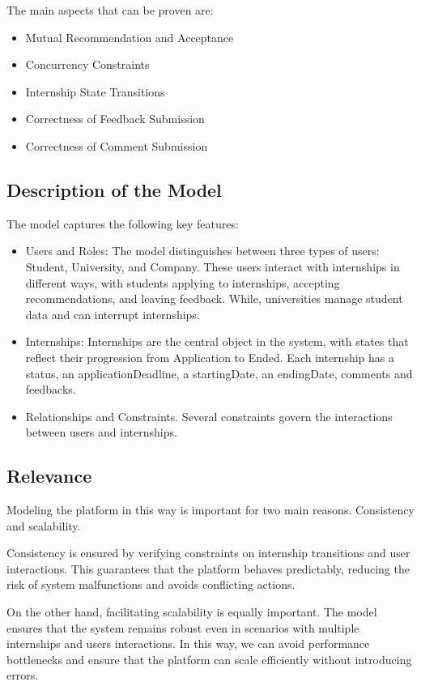 \documentclass{article}
\begin{document}
The main aspects that can be proven are:
\begin{itemize}
    \item Mutual Recommendation and Acceptance
    \item Concurrency Constraints
    \item Internship State Transitions
    \item Correctness of Feedback Submission
    \item Correctness of Comment Submission
\end{itemize}
\subsection{Description of the Model}
The model captures the following key features:
\begin{itemize}
    \item Users and Roles:
    The model distinguishes between three types of users: Student, University, and Company. These users interact with internships in different ways, with students applying to internships, accepting recommendations, and leaving feedback. While, universities manage student data and can interrupt internships.
    \item Internships:
    Internships are the central object in the system, with states that reflect their progression from Application to Ended. Each internship has a status, an applicationDeadline, a startingDate, an endingDate, comments and feedbacks.
    \item Relationships and Constraints.
    Several constraints govern the interactions between users and internships.
\end{itemize}
\subsection{Relevance}
Modeling the platform in this way is important for two main reasons. Consistency and scalability.

Consistency is ensured by verifying constraints on internship transitions and user interactions. This guarantees that the platform behaves predictably, reducing the risk of system malfunctions and avoids conflicting actions.

On the other hand, facilitating scalability is equally important. The model ensures that the system remains robust even in scenarios with multiple internships and users interactions. In this way, we can avoid performance bottlenecks and ensure that the platform can scale efficiently without introducing errors.
\end{document}

